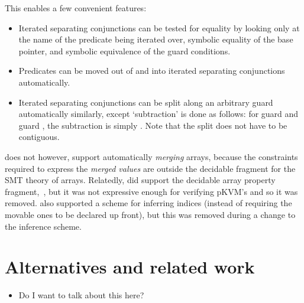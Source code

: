 This enables a few convenient features:
\begin{itemize}
    \item Iterated separating conjunctions can be tested for equality by
        looking only at the name of the predicate being iterated over, symbolic
        equality of the base pointer, and symbolic equivalence of the guard
        conditions.
    \item Predicates can be moved out of and into iterated separating conjunctions
        automatically.
    \item Iterated separating conjunctions can be split along an arbitrary
        guard automatically similarly, except `subtraction' is done as follows:
        for guard  and guard
        , %
        the subtraction is simply . Note that the split %
        does not have to be contiguous.
\end{itemize}

 does not however, support automatically \emph{merging} arrays, because
the constraints required to express the \emph{merged values} are outside the
decidable fragment for the SMT theory of arrays. Relatedly,  did
support the decidable array property fragment,~, but
it was not expressive enough for verifying pKVM's  and so
it was removed.  also supported a scheme for inferring indices (instead
of requiring the movable ones to be declared up front), but this was removed
during a change to the inference scheme.

\section{Alternatives and related work}

\begin{itemize}
    \item Do I want to talk about this here?
\end{itemize}

